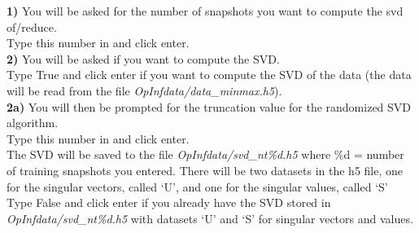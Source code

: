 \documentclass[11pt]{article} %
\begin{document}
\noindent \textbf{1)} You will be asked for the number of snapshots you want to compute the svd of/reduce. \\
Type this number in and click enter. \\

\noindent \textbf{2)} You will be asked if you want to compute the SVD. \\
\noindent Type True and click enter if you want to compute the SVD of the data (the data will be read from the file \textit{OpInfdata/data\_minmax.h5}). \\
\indent \textbf{2a)} You will then be prompted for the truncation value for the randomized SVD algorithm.\\
\indent Type this number in and click enter.\\
The SVD will be saved to the file \textit{OpInfdata/svd\_nt\%d.h5} where \%d = number of training snapshots you entered. There will be two datasets in the h5 file, one for the singular vectors, called `U', and one for the singular values, called `S'\\

\noindent Type False and click enter if you already have the SVD stored in \textit{OpInfdata/svd\_nt\%d.h5} with datasets `U' and `S' for singular vectors and values. 
\\
\end{document}
